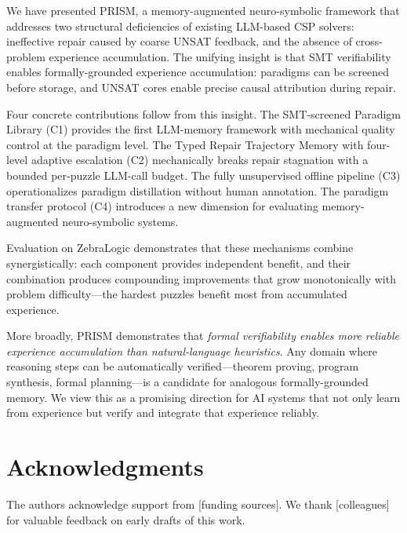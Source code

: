 We have presented PRISM, a memory-augmented neuro-symbolic framework that addresses two structural deficiencies of existing LLM-based CSP solvers: ineffective repair caused by coarse UNSAT feedback, and the absence of cross-problem experience accumulation. The unifying insight is that SMT verifiability enables formally-grounded experience accumulation: paradigms can be screened before storage, and UNSAT cores enable precise causal attribution during repair.

Four concrete contributions follow from this insight. The SMT-screened Paradigm Library (C1) provides the first LLM-memory framework with mechanical quality control at the paradigm level. The Typed Repair Trajectory Memory with four-level adaptive escalation (C2) mechanically breaks repair stagnation with a bounded per-puzzle LLM-call budget. The fully unsupervised offline pipeline (C3) operationalizes paradigm distillation without human annotation. The paradigm transfer protocol (C4) introduces a new dimension for evaluating memory-augmented neuro-symbolic systems.

Evaluation on ZebraLogic demonstrates that these mechanisms combine synergistically: each component provides independent benefit, and their combination produces compounding improvements that grow monotonically with problem difficulty—the hardest puzzles benefit most from accumulated experience.

More broadly, PRISM demonstrates that \textit{formal verifiability enables more reliable experience accumulation than natural-language heuristics}. Any domain where reasoning steps can be automatically verified—theorem proving, program synthesis, formal planning—is a candidate for analogous formally-grounded memory. We view this as a promising direction for AI systems that not only learn from experience but verify and integrate that experience reliably.

\section*{Acknowledgments}

The authors acknowledge support from [funding sources]. We thank [colleagues] for valuable feedback on early drafts of this work.
